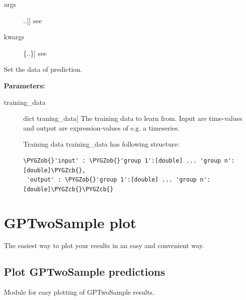 \documentclass[letterpaper,10pt,english]{sphinxmanual}
\def\PYGZob{\char`\{}
\def\PYGZcb{\char`\}}
\begin{document}
\begin{fulllineitems}
\begin{fulllineitems}
\begin{description}
\item[{args}] \leavevmode{[}{[}..{]}{]}
see 

\item[{kwargs}] \leavevmode{[}\{..\}{]}
see 

\end{description}

\end{fulllineitems}


\begin{fulllineitems}
\label{base:gptwosample.twosample.twosample_base.TwoSampleBase.set_data}
Set the data of prediction.

\textbf{Parameters:}
\begin{description}
\item[{training\_data}] \leavevmode{[}dict traning\_data{]}
The training data to learn from. Input are time-values and
output are expression-values of e.g. a timeseries.

Training data training\_data has following structure:

\begin{Verbatim}[commandchars=\\\{\}]
\PYGZob{}'input' : \PYGZob{}'group 1':[double] ... 'group n':[double]\PYGZcb{},
 'output' : \PYGZob{}'group 1':[double] ... 'group n':[double]\PYGZcb{}\PYGZcb{}
\end{Verbatim}

\end{description}

\end{fulllineitems}


\end{fulllineitems}

\label{plot:module-gptwosample.plot}

\section{GPTwoSample plot}
\label{plot::doc}\label{plot:gptwosample-plot}
The easiest way to plot your results in an easy and convenient way.
\label{plot:module-gptwosample.plot.plot_basic}

\subsection{Plot GPTwoSample predictions}
\label{plot:plot-gptwosample-predictions}
Module for easy plotting of GPTwoSample results.
\end{document}
